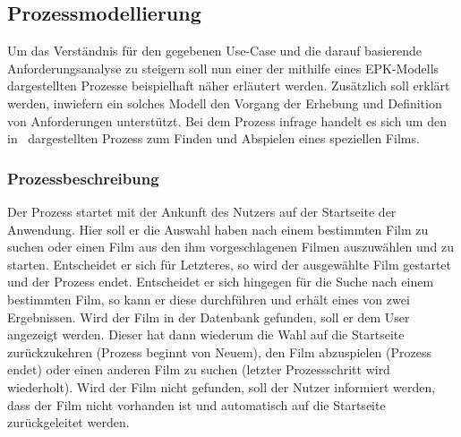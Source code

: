 \subsection{Prozessmodellierung}\label{subsec:prozessmodelle}
Um das Verständnis für den gegebenen Use-Case und die darauf basierende Anforderungsanalyse zu steigern soll nun einer der
mithilfe eines EPK-Modells dargestellten Prozesse beispielhaft näher erläutert werden.
Zusätzlich soll erklärt werden, inwiefern ein solches Modell den Vorgang der Erhebung und Definition von Anforderungen
unterstützt.
Bei dem Prozess infrage handelt es sich um den in~ dargestellten Prozess zum Finden und Abspielen
eines speziellen Films.

\subsubsection{Prozessbeschreibung}\label{subsubsec:prozessbeschreibung}
Der Prozess startet mit der Ankunft des Nutzers auf der Startseite der Anwendung.
Hier soll er die Auswahl haben nach einem bestimmten Film zu suchen oder einen Film aus den ihm vorgeschlagenen Filmen
auszuwählen und zu starten.
Entscheidet er sich für Letzteres, so wird der ausgewählte Film gestartet und der Prozess endet.
Entscheidet er sich hingegen für die Suche nach einem bestimmten Film, so kann er diese durchführen und erhält eines von
zwei Ergebnissen.
Wird der Film in der Datenbank gefunden, soll er dem User angezeigt werden.
Dieser hat dann wiederum die Wahl auf die Startseite zurückzukehren (Prozess beginnt von Neuem), den Film abzuspielen
(Prozess endet) oder einen anderen Film zu suchen (letzter Prozessschritt wird wiederholt).
Wird der Film nicht gefunden, soll der Nutzer informiert werden, dass der Film nicht vorhanden ist und automatisch auf die
Startseite zurückgeleitet werden.

